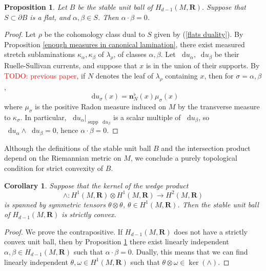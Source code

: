 \documentclass[reqno,11pt]{amsart}
\newcommand{\RR}{\mathbf{R}}
\newcommand*\dif{\mathop{}\!\mathrm{d}}
\DeclareMathOperator{\supp}{supp}
\newcommand{\normal}{\mathbf n}
\newtheorem{proposition}[theorem]{Proposition}
\newtheorem{corollary}[theorem]{Corollary}
\theoremstyle{definition}
\numberwithin{equation}{section}
\newcommand\todo[1]{\textcolor{red}{TODO: #1}}
\begin{document}
\begin{proposition}\label{flats are nonintersecting}
Let $B$ be the stable unit ball of $H_{d - 1}(M, \RR)$.
Suppose that $S \subset \partial B$ is a flat, and $\alpha, \beta \in S$. Then $\alpha \cdot \beta = 0$.
\end{proposition}
\begin{proof}
Let $\rho$ be the cohomology class dual to $S$ given by (\ref{flats duality}).
By Proposition \ref{enough measures in canonical lamination}, there exist measured stretch sublaminations $\kappa_\alpha, \kappa_\beta$ of $\lambda_\rho$, of classes $\alpha, \beta$.
Let $\dif u_\alpha, \dif u_\beta$ be their Ruelle-Sullivan currents, and suppose that $x$ is in the union of their supports.
By \todo{previous paper}, if $N$ denotes the leaf of $\lambda_\rho$ containing $x$, then for $\sigma = \alpha, \beta$,
$$\dif u_\sigma(x) = \normal_N^\flat(x) \mu_\sigma(x)$$
where $\mu_\sigma$ is the positive Radon measure induced on $M$ by the transverse measure to $\kappa_\sigma$.
In particular, $\dif u_\alpha|_{\supp \dif u_\beta}$ is a scalar multiple of $\dif u_\beta$, so $\dif u_\alpha \wedge \dif u_\beta = 0$, hence $\alpha \cdot \beta = 0$.
\end{proof}

Although the definitions of the stable unit ball $B$ and the intersection product depend on the Riemannian metric on $M$, we conclude a purely topological condition for strict convexity of $B$.

\begin{corollary}\label{condition for strict convexity}
Suppose that the kernel of the wedge product 
\begin{equation}\label{wedge product}
\wedge: H^1(M, \RR) \otimes H^1(M, \RR) \to H^2(M, \RR)
\end{equation}
is spanned by symmetric tensors $\theta \otimes \theta$, $\theta \in H^1(M, \RR)$.
Then the stable unit ball of $H_{d - 1}(M, \RR)$ is strictly convex.
\end{corollary}
\begin{proof}
We prove the contrapositive.
If $H_{d - 1}(M, \RR)$ does not have a strictly convex unit ball, then by Proposition \ref{flats are nonintersecting} there exist linearly independent $\alpha, \beta \in H_{d - 1}(M, \RR)$ such that $\alpha \cdot \beta = 0$.
Dually, this means that we can find linearly independent $\theta, \omega \in H^1(M, \RR)$ such that $\theta \otimes \omega \in \ker(\wedge)$.
\end{proof}
\end{document}
